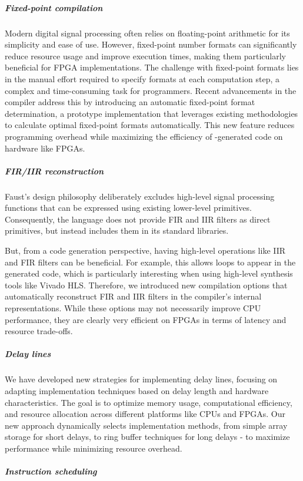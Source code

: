 \subparagraph{Fixed-point compilation}

Modern digital signal processing often relies on floating-point arithmetic for its simplicity and ease of use. However,
fixed-point number formats can significantly reduce resource usage and improve execution times, making them particularly
beneficial for FPGA implementations. The challenge with fixed-point formats lies in the manual effort required to
specify formats at each computation step, a complex and time-consuming task for programmers. Recent advancements in the
\F{} compiler address this by introducing an automatic fixed-point format determination, a prototype implementation that
leverages existing methodologies to calculate optimal fixed-point formats automatically. This new feature reduces
programming overhead while maximizing the efficiency of \F{}-generated code on hardware like FPGAs.

\subparagraph{FIR/IIR reconstruction}

Faust's design philosophy deliberately excludes high-level signal processing functions that can be expressed using
existing lower-level primitives. Consequently, the language does not provide FIR and IIR filters as direct primitives,
but instead includes them in its standard libraries.

But, from a code generation perspective, having high-level operations like IIR and FIR filters can be beneficial. For
example, this allows loops to appear in the generated code, which is particularly interesting when using high-level
synthesis tools like Vivado HLS. Therefore, we introduced new compilation options that automatically reconstruct FIR and
IIR filters in the compiler's internal representations. While these options may not necessarily improve CPU performance,
they are clearly very efficient on FPGAs in terms of latency and resource trade-offs.

\subparagraph{Delay lines}

We have developed new strategies for implementing delay lines, focusing on adapting implementation techniques based on
delay length and hardware characteristics. The goal is to optimize memory usage, computational efficiency, and resource
allocation across different platforms like CPUs and FPGAs. Our new approach dynamically selects implementation methods,
from simple array storage for short delays, to ring buffer techniques for long delays - to maximize performance while
minimizing resource overhead.

\subparagraph{Instruction scheduling}

